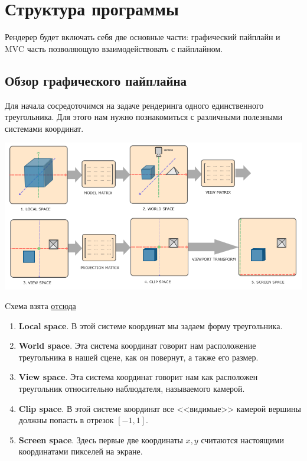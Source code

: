 \documentclass{article}
\begin{document}
\section{Структура программы}

Рендерер будет включать себя две основные части: графический пайплайн 
и MVC часть позволяющую взаимодействовать с пайплайном. 

\subsection{Обзор графического пайплайна}

Для начала сосредоточимся на задаче рендеринга одного единственного 
треугольника. Для этого нам нужно познакомиться с различными полезными 
системами координат.

\begin{center}
\includegraphics[scale = 0.6]{coordinate_systems.png}

Cхема взята \href{https://learnopengl.com/Getting-started/Coordinate-Systems}{отсюда}
\end{center}

\begin{enumerate}
    \item \textbf{Local space}.
    В этой системе координат мы задаем форму треугольника.
    \item \textbf{World space}.
    Эта система координат говорит нам расположение треугольника в нашей сцене, как 
    он повернут, а также его размер.
    \item \textbf{View space}.
    Эта система координат говорит нам как расположен треугольник 
    относительно наблюдателя, называемого камерой.
    \item \textbf{Clip space}.
    В этой системе координат все <<видимые>> камерой вершины должны 
    попасть в отрезок $[-1, 1]$. 
    \item \textbf{Screen space}. Здесь первые 
    две координаты $x, y$ считаются настоящими координатами пикселей на экране.
\end{enumerate}
\end{document}
